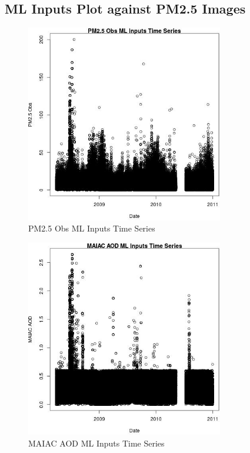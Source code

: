 \subsection{ML Inputs Plot against PM2.5 Images} 
 

\begin{figure} 
\centering  
\includegraphics[width=0.77\textwidth]{Code_Outputs/ML_input_report_ML_input_PM25_Step5_part_d_de_duplicated_aves_ML_inputpdfs_PM25_ObsvDate.jpg} 
\caption{\label{fig:ML_input_report_ML_input_PM25_Step5_part_d_de_duplicated_aves_ML_inputpdfsPM25_ObsvDate}PM2.5 Obs ML Inputs Time Series} 
\end{figure} 
 

\begin{figure} 
\centering  
\includegraphics[width=0.77\textwidth]{Code_Outputs/ML_input_report_ML_input_PM25_Step5_part_d_de_duplicated_aves_ML_inputpdfs_MAIAC_AODvDate.jpg} 
\caption{\label{fig:ML_input_report_ML_input_PM25_Step5_part_d_de_duplicated_aves_ML_inputpdfsMAIAC_AODvDate}MAIAC AOD ML Inputs Time Series} 
\end{figure} 
 


